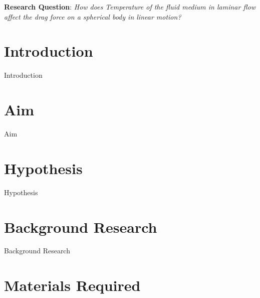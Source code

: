 \documentclass[12pt, a4paper]{article}
\begin{document}
\maketitle

\tableofcontents
\clearpage



\begin{abstract}
    {Abstract}
\end{abstract}



\large
			
		{\textbf{Research Question}: \textit{How does Temperature of the fluid medium in laminar flow affect the drag force on a spherical body in linear motion?} }
			
\normalsize

\section{{Introduction}}
        
        {Introduction}       
        
\section{{Aim}}
        
        {Aim}

			
			
			
				
\section{{Hypothesis}}
        
        {Hypothesis}    
        
\section{{Background Research}}
        
        {Background Research}
        
\section{{Materials Required}}
        
\end{document}
